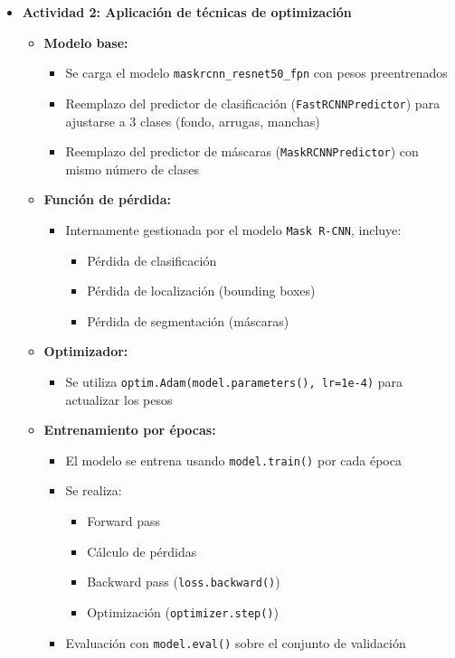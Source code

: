 \begin{enumerate}
\begin{itemize}
\begin{itemize}
    \end{itemize}
  
    \item \textbf{Actividad 2: Aplicación de técnicas de optimización}
    \begin{itemize}
      \item \textbf{Modelo base:}
      \begin{itemize}
        \item Se carga el modelo \texttt{maskrcnn\_resnet50\_fpn} con pesos preentrenados
        \item Reemplazo del predictor de clasificación (\texttt{FastRCNNPredictor}) para ajustarse a 3 clases (fondo, arrugas, manchas)
        \item Reemplazo del predictor de máscaras (\texttt{MaskRCNNPredictor}) con mismo número de clases
      \end{itemize}
  
      \item \textbf{Función de pérdida:}
      \begin{itemize}
        \item Internamente gestionada por el modelo \texttt{Mask R-CNN}, incluye:
        \begin{itemize}
          \item Pérdida de clasificación
          \item Pérdida de localización (bounding boxes)
          \item Pérdida de segmentación (máscaras)
        \end{itemize}
      \end{itemize}
  
      \item \textbf{Optimizador:}
      \begin{itemize}
        \item Se utiliza \texttt{optim.Adam(model.parameters(), lr=1e-4)} para actualizar los pesos
      \end{itemize}
  
      \item \textbf{Entrenamiento por épocas:}
      \begin{itemize}
        \item El modelo se entrena usando \texttt{model.train()} por cada época
        \item Se realiza:
        \begin{itemize}
          \item Forward pass
          \item Cálculo de pérdidas
          \item Backward pass (\texttt{loss.backward()})
          \item Optimización (\texttt{optimizer.step()})
        \end{itemize}
        \item Evaluación con \texttt{model.eval()} sobre el conjunto de validación
      \end{itemize}
  

\end{itemize}
\end{itemize}
\end{enumerate}
